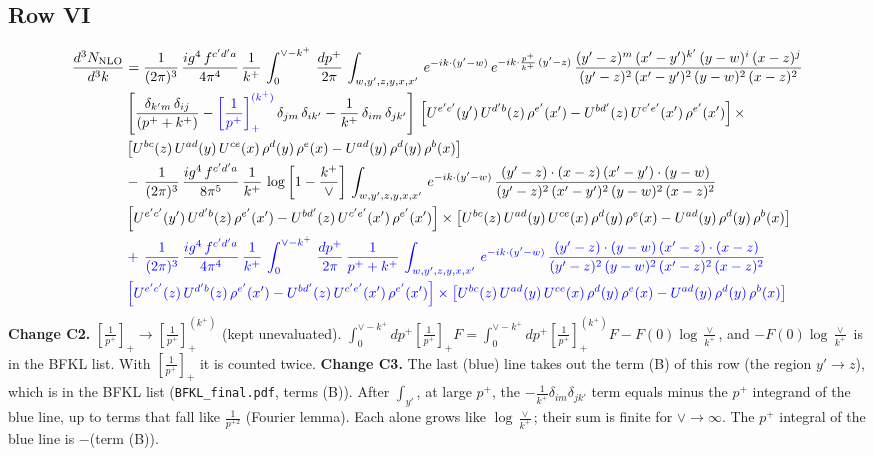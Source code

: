 \documentclass[9pt]{article}
\newcommand{\new}[1]{{\color{blue}#1}}
\newcommand{\nc}{\color{blue}}
\numberwithin{equation}{section}
\begin{document}
\subsection{Row VI}
\begin{align}
    \frac{d^{3}N_{\rm NLO}}{d^{3}k} & = \frac{1}{(2\pi)^{3}}\, \frac{ig^{4}\,f^{c'd'a}}{4\pi^{4}}\, \frac{1}{k^{+}}\,\int_{0}^{\vee-k^{+}}\, \frac{dp^{+}}{2\pi}\, \int_{w,y',z,y,x,x'}\, e^{-ik\cdot (y'-w)}\, e^{-ik\cdot \frac{p^{+}}{k^{+}}\,(y'-z)}\,\frac{(y'-z)^{m}\,(x'-y')^{k'}\,(y-w)^{i}\,(x-z)^{j}}{(y'-z)^{2}\,(x'-y')^{2}\,(y-w)^{2}\,(x-z)^{2}}\notag \\ & \left[\frac{\delta_{k'm}\,\delta_{ij}}{(p^{+}+k^{+})}-\new{\left[\frac{1}{p^{+}}\right]_{+}^{(k^{+})}}\,\delta_{jm}\,\delta_{ik'}-\frac{1}{k^{+}}\, \delta_{im}\, \delta_{jk'}\right]\, \left[U^{e'c'}(y')\,U^{d'b}(z)\,\rho^{e'}(x')-U^{bd'}(z)\,U^{c'e'}(x')\,\rho^{e'}(x')\right]\times\notag \\ &  \left[U^{bc}(z)\,U^{ad}(y)\,U^{ce}(x)\,\rho^{d}(y)\,\rho^{e}(x)-U^{ad}(y)\,\rho^{d}(y)\,\rho^{b}(x)\right]\notag \\ &  -\,\frac{1}{(2\pi)^{3}}\, \frac{ig^{4}\,f^{c'd'a}}{8\pi^{5}}\, \frac{1}{k^{+}}\, \log{\left[1-\frac{k^{+}}{\vee}\right]}\, \int_{w,y',z,y,x,x'}\, e^{-ik\cdot (y'-w)}\,\frac{(y'-z)\cdot (x-z)\,(x'-y')\cdot (y-w)}{(y'-z)^{2}\,(x'-y')^{2}\,(y-w)^{2}\,(x-z)^{2}}\notag \\ & \left[U^{e'c'}(y')\,U^{d'b}(z)\,\rho^{e'}(x')-U^{bd'}(z)\,U^{c'e'}(x')\,\rho^{e'}(x')\right]\times  \left[U^{bc}(z)\,U^{ad}(y)\,U^{ce}(x)\,\rho^{d}(y)\,\rho^{e}(x)-U^{ad}(y)\,\rho^{d}(y)\,\rho^{b}(x)\right]
\notag \\ & \nc +\,\frac{1}{(2\pi)^{3}}\, \frac{ig^{4}\,f^{c'd'a}}{4\pi^{4}}\, \frac{1}{k^{+}}\,\int_{0}^{\vee-k^{+}}\, \frac{dp^{+}}{2\pi}\,\frac{1}{p^{+}+k^{+}}\, \int_{w,y',z,y,x,x'}\, e^{-ik\cdot (y'-w)}\,\frac{(y'-z)\cdot (y-w)\,(x'-z)\cdot (x-z)}{(y'-z)^{2}\,(y-w)^{2}\,(x'-z)^{2}\,(x-z)^{2}}\notag \\ & \nc \left[U^{e'c'}(z)\,U^{d'b}(z)\,\rho^{e'}(x')-U^{bd'}(z)\,U^{c'e'}(x')\,\rho^{e'}(x')\right]\times\left[U^{bc}(z)\,U^{ad}(y)\,U^{ce}(x)\,\rho^{d}(y)\,\rho^{e}(x)-U^{ad}(y)\,\rho^{d}(y)\,\rho^{b}(x)\right]
\end{align}
\new{\textbf{Change C2.} $\left[\frac{1}{p^+}\right]_+\to\left[\frac{1}{p^+}\right]_+^{(k^+)}$ (kept unevaluated). $\int_0^{\vee-k^+}dp^+\left[\frac{1}{p^+}\right]_+F=\int_0^{\vee-k^+}dp^+\left[\frac{1}{p^+}\right]_+^{(k^+)}F-F(0)\log\frac{\vee}{k^+}$, and $-F(0)\log\frac{\vee}{k^+}$ is in the BFKL list. With $\left[\frac{1}{p^+}\right]_+$ it is counted twice. \textbf{Change C3.} The last (blue) line takes out the term (B) of this row (the region $y'\to z$), which is in the BFKL list (\texttt{BFKL\_final.pdf}, terms (B)). After $\int_{y'}$, at large $p^+$, the $-\frac{1}{k^+}\delta_{im}\delta_{jk'}$ term equals minus the $p^+$ integrand of the blue line, up to terms that fall like $\frac{1}{p^{+2}}$ (Fourier lemma). Each alone grows like $\log\frac{\vee}{k^+}$; their sum is finite for $\vee\to\infty$. The $p^+$ integral of the blue line is $-$(term (B)).}
\end{document}
